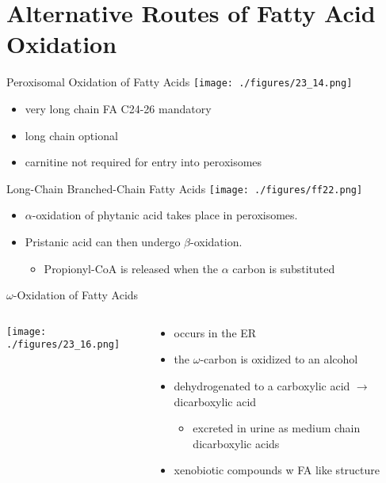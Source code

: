 \documentclass[presentation, smaller]{beamer}
\begin{document}
\section{Alternative Routes of Fatty Acid Oxidation}
\label{sec:orgheadline20}

\begin{frame}[label={sec:orgheadline16}]{Peroxisomal Oxidation of Fatty Acids}
\texttt{[image: ./figures/23\_14.png]}

\begin{itemize}
\item very long chain FA C24-26 mandatory
\item long chain optional
\item carnitine not required for entry into peroxisomes
\end{itemize}
\end{frame}

\begin{frame}[label={sec:orgheadline17}]{Long-Chain Branched-Chain Fatty Acids}
\centering
\texttt{[image: ./figures/ff22.png]}

\begin{itemize}
\item \(\alpha\)-oxidation of phytanic acid takes place in peroxisomes.
\item Pristanic acid can then undergo \(\beta\)-oxidation.
\begin{itemize}
\item Propionyl-CoA is released when the \(\alpha\) carbon is substituted
\end{itemize}
\end{itemize}
\end{frame}

\begin{frame}[label={sec:orgheadline18}]{\(\omega\)-Oxidation of Fatty Acids}
\begin{columns}
\begin{column}{0.5\columnwidth}
\centering
\texttt{[image: ./figures/23\_16.png]}
\end{column}


\begin{column}{0.5\columnwidth}
\begin{itemize}
\item occurs in the ER
\item the \(\omega\)-carbon is oxidized to an alcohol
\item dehydrogenated to a carboxylic acid \(\to\) dicarboxylic acid
\begin{itemize}
\item excreted in urine as medium chain dicarboxylic acids
\end{itemize}
\item xenobiotic compounds w FA like structure
\end{itemize}
\end{column}
\end{columns}
\end{frame}
\end{document}
